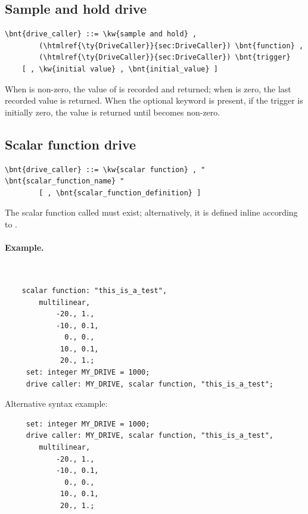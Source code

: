 \subsection{Sample and hold drive}
\begin{Verbatim}[commandchars=\\\{\}]
    \bnt{drive_caller} ::= \kw{sample and hold} ,
        (\htmlref{\ty{DriveCaller}}{sec:DriveCaller}) \bnt{function} ,
        (\htmlref{\ty{DriveCaller}}{sec:DriveCaller}) \bnt{trigger}
	[ , \kw{initial value} , \bnt{initial_value} ]
\end{Verbatim}
When  is non-zero, the value of 
is recorded and returned; when  is zero,
the last recorded value is returned.
When the optional keyword  is present,
if the trigger is initially zero, the value 
is returned until  becomes non-zero.

\subsection{Scalar function drive}
\begin{Verbatim}[commandchars=\\\{\}]
    \bnt{drive_caller} ::= \kw{scalar function} , " \bnt{scalar_function_name} "
        [ , \bnt{scalar_function_definition} ]
\end{Verbatim}
The scalar function called  must exist;
alternatively, it is defined inline according to
.

\paragraph{Example.} \
\begin{verbatim}
    scalar function: "this_is_a_test",
        multilinear,
            -20., 1.,
            -10., 0.1,
              0., 0.,
             10., 0.1,
             20., 1.;
     set: integer MY_DRIVE = 1000;
     drive caller: MY_DRIVE, scalar function, "this_is_a_test";
\end{verbatim}
Alternative syntax example:
\begin{verbatim}
     set: integer MY_DRIVE = 1000;
     drive caller: MY_DRIVE, scalar function, "this_is_a_test",
        multilinear,
            -20., 1.,
            -10., 0.1,
              0., 0.,
             10., 0.1,
             20., 1.;
\end{verbatim}


